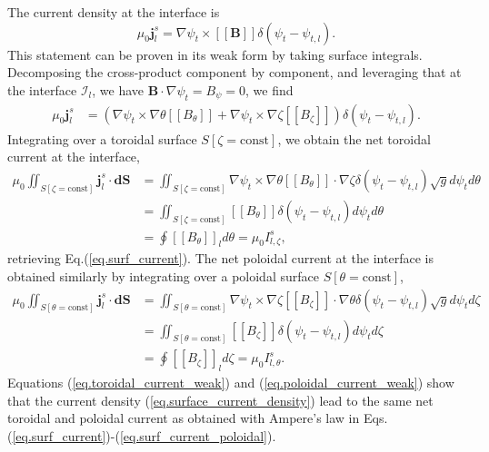 \documentclass[my_thesis.tex]{subfiles}
\begin{document}
The current density at the interface is 
\begin{equation}
	\mu_0\mathbf{j}^s_l = \nabla\psi_t \times \left[\left[\mathbf{B}\right]\right] \delta(\psi_t-\psi_{t,l}). \label{eq.surface_current_density}
\end{equation}
This statement can be proven in its weak form by taking surface integrals. Decomposing the cross-product component by component, and leveraging that at the interface $\mathcal{I}_l$, we have $\mathbf{B}\cdot\nabla\psi_t=B_\psi=0$, we find
\begin{align}
	\mu_0\mathbf{j}^s_l &= \left(\nabla\psi_t\times\nabla\theta \left[\left[B_\theta\right]\right] + \nabla\psi_t\times\nabla\zeta \left[\left[B_\zeta\right]\right]\right) \delta(\psi_t-\psi_{t,l}).
\end{align}
Integrating over a toroidal surface $S[\zeta=\text{const}]$, we obtain the net toroidal current at the interface,
\begin{align}
	\mu_0\iint_{S[\zeta=\text{const}]}\mathbf{j}^s_l\cdot \mathbf{dS} &= \iint_{S[\zeta=\text{const}]} \nabla\psi_t\times\nabla\theta \left[\left[B_\theta\right]\right] \cdot \nabla\zeta \delta(\psi_t-\psi_{t,l}) \sqrt{g}d\psi_t d\theta\\
	&= \iint_{S[\zeta=\text{const}]} \left[\left[B_\theta\right]\right] \delta(\psi_t-\psi_{t,l})d\psi_t d\theta\\
	&= \oint \left[\left[B_\theta\right]\right]_l d\theta = \mu_0 I^s_{l,\zeta}, \label{eq.toroidal_current_weak}
\end{align}
retrieving Eq.(\ref{eq.surf_current}). The net poloidal current at the interface is obtained similarly by integrating over a poloidal surface $S[\theta=\text{const}]$,
\begin{align}
	\mu_0\iint_{S[\theta=\text{const}]}\mathbf{j}^s_l\cdot \mathbf{dS} &= \iint_{S[\theta=\text{const}]} \nabla\psi_t\times\nabla\zeta \left[\left[B_\zeta\right]\right] \cdot \nabla\theta \delta(\psi_t-\psi_{t,l}) \sqrt{g}d\psi_t d\zeta\\
	&= \iint_{S[\theta=\text{const}]} \left[\left[B_\zeta\right]\right] \delta(\psi_t-\psi_{t,l})d\psi_t d\zeta\\
	&= \oint \left[\left[B_\zeta\right]\right]_l d\zeta = \mu_0 I^s_{l,\theta}. \label{eq.poloidal_current_weak}
\end{align}
Equations (\ref{eq.toroidal_current_weak}) and (\ref{eq.poloidal_current_weak}) show that the current density (\ref{eq.surface_current_density}) lead to the same net toroidal and poloidal current as obtained with Ampere's law in Eqs.(\ref{eq.surf_current})-(\ref{eq.surf_current_poloidal}).
\end{document}
